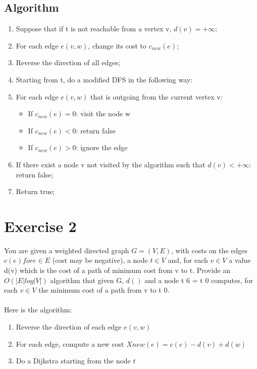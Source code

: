 \documentclass[]{article}
\begin{document}
\subsection{Algorithm}

\begin{enumerate}

\item Suppose that if t is not reachable from a vertex v, $ d(v) = + \infty$;
\item For each edge $e(v,w)$, change its cost to $ c_{new}(e) $;

\item Reverse the direction of all edges;

\item Starting from t, do a modified DFS in the following way:

\item For each edge $e(v,w)$ that is outgoing from the current vertex v:

\begin{itemize}


\item If $c_{new}(e) = 0$: visit the node w
\item If $c_{new}(e) < 0$: return false
\item If $c_{new}(e) > 0$: ignore the edge

\end{itemize}

\item If there exist a node v not visited by the algorithm such that $d(v) < +\infty$: return false;
\item Return true;


\end{enumerate}


\section{Exercise 2}

You are given a weighted directed graph $G = (V, E)$, with costs on the edges $c(e) for e ∈ E$ (cost may
be negative), a node $t ∈ V$ and, for each $v ∈ V$ a value d(v) which is the cost of a path of minimum cost
from v to t. Provide an $O(|E| log |V |)$ algorithm that given G, $d()$ and a node t 6 = t 0 computes, for each
$v ∈ V$ the minimum cost of a path from v to t 0.
\\\\
Here is the algorithm:
\begin{enumerate}
  \item Reverse the direction of each edge $e(v, w)$
  \item For each edge, compute a new cost $X{new}(e) = c(e)-d(v)+d(w)$
  \item Do a Dijkstra starting from the node $t$
\end{enumerate}
\end{document}
